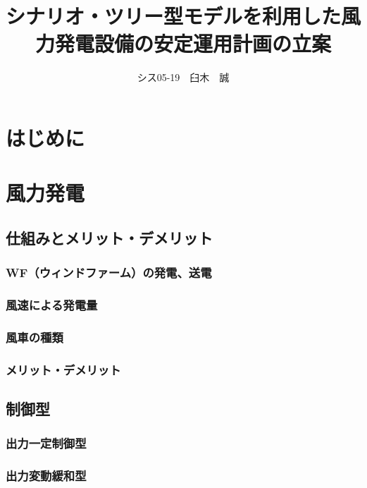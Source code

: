\documentclass[11pt,a4paper]{jsarticle}
\title{シナリオ・ツリー型モデルを利用した風力発電設備の安定運用計画の立案}
\author{シス05-19　臼木　誠}
\date{\empty}
\begin{document}
\maketitle

\tableofcontents

\section{はじめに}

\section{風力発電}

\subsection{仕組みとメリット・デメリット}

\subsubsection{WF（ウィンドファーム）の発電、送電}

\subsubsection{風速による発電量}

\subsubsection{風車の種類}

\subsubsection{メリット・デメリット}

\subsection{制御型}

\subsubsection{出力一定制御型}

\subsubsection{出力変動緩和型}
\end{document}
